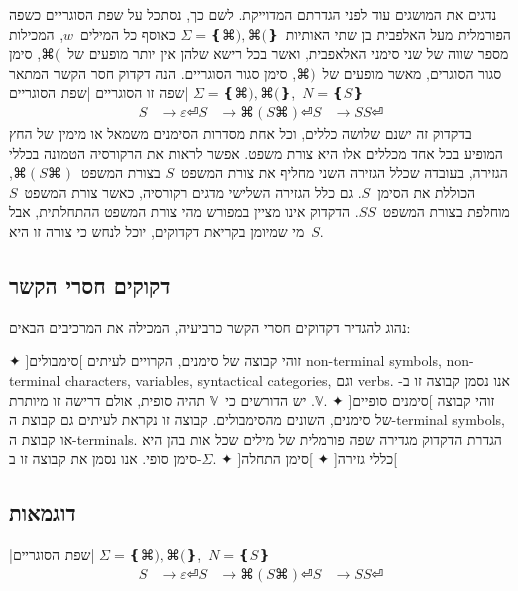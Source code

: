 נדגים את המושגים עוד לפני הגדרתם המדוייקת. לשם כך, נסתכל על שפת הסוגריים כשפה
הפורמלית מעל האלפבית בן שתי האותיות~$Σ=❴⌘), ⌘(❵$ כאוסף כל המילים~$w$,
המכילות מספר שווה
של שני סימני האלאפבית, ואשר בכל רישא שלהן אין יותר מופעים של~$⌘($, סימן סגור
הסוגרים, מאשר מופעים של~$⌘)$, סימן סגור הסוגריים.
הנה דקדוק חסר הקשר המתאר שפה זו
הסוגריים |שפת הסוגריים|
$Σ=❴⌘), ⌘(❵$,~$N=❴S❵$
\begin{equation}
  \label{eq:parenthesis}
  \begin{split}
    S &→ε ⏎
    S &→⌘(S⌘)⏎
    S &→SS ⏎
  \end{split}
\end{equation}
בדקדוק זה ישנם שלושה כללים, וכל אחת מסדרות הסימנים משמאל או מימין של החץ המופיע
בכל אחד מכללים אלו היא צורת משפט. אפשר לראות את הרקורסיה הטמונה בכללי הגזירה,
בעובדה שכלל הגזירה השני מחליף את צורת המשפט~$S$ בצורת המשפט~$⌘(S⌘)$,
הכוללת את הסימן~$S$. גם כלל הגזירה השלישי מדגים רקורסיה, כאשר צורת המשפט~$S$
מוחלפת בצורת המשפט~$SS$. הדקדוק אינו מציין במפורש מהי צורת המשפט ההתחלתית, אבל
מי שמיומן בקריאת דקדוקים, יוכל לנחש כי צורה זו היא~$S$.

\begin{editing}
\subsection{דקוקים חסרי הקשר}
נהוג להגדיר דקדוקים חסרי הקשר כרביעיה,
המכילה את המרכיבים הבאים:
\begin{description}
  ✦ ]סימבולים[ זוהי קבוצה של סימנים, הקרויים לעיתים non-terminal symbols,
  non-terminal characters, variables, syntactical categories, וגם verbs.
  אנו נסמן קבוצה זו ב-$𝕍$. יש הדורשים כי~$𝕍$ תהיה סופית,
  אולם דרישה זו מיותרת.
  ✦ ]סימנים סופיים[ זוהי קבוצה של סימנים, השונים מהסימבולים. קבוצה זו נקראת
  לעיתים גם קבוצת ה-terminal symbols, או קבוצת ה-terminals. הגדרת הדקדוק מגדירה
  שפה פורמלית של מילים שכל אות בהן היא סימן סופי. אנו נסמן את
  קבוצה זו ב-$Σ$.
  ✦ ]כללי גזירה[
  ✦ ]סימן התחלה[
\end{description}
\end{editing}

\subsection{דוגמאות}

|שפת הסוגריים|
$Σ=❴⌘), ⌘(❵$,~$N=❴S❵$
\begin{equation}
  \label{eq:parenthesis}
  \begin{split}
    S &→ε ⏎
    S &→⌘(S⌘)⏎
    S &→SS ⏎
  \end{split}
\end{equation}


